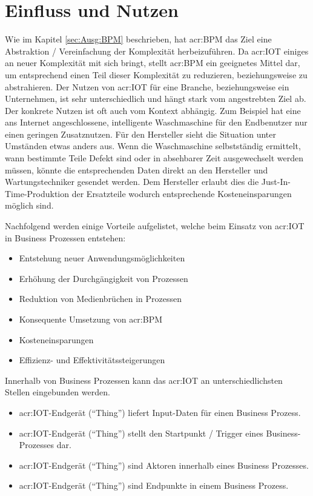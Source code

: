 \section{Einfluss und Nutzen}
Wie im Kapitel \ref{sec:Ausg:BPM}  beschrieben, hat \gls{acr:BPM} das Ziel eine Abstraktion / Vereinfachung der Komplexität herbeizuführen. Da \gls{acr:IOT} einiges an neuer Komplexität mit sich bringt, stellt \gls{acr:BPM} ein geeignetes Mittel dar, um entsprechend einen Teil dieser Komplexität zu reduzieren, beziehungsweise zu abstrahieren. Der Nutzen von \gls{acr:IOT} für eine Branche, beziehungsweise ein Unternehmen, ist sehr unterschiedlich und hängt stark vom angestrebten Ziel ab. Der konkrete Nutzen ist oft auch vom Kontext abhängig. Zum Beispiel hat eine ans Internet angeschlossene, intelligente Waschmaschine für den Endbenutzer nur einen geringen Zusatznutzen. Für den Hersteller sieht die Situation unter Umständen etwas anders aus. Wenn die Waschmaschine selbstständig ermittelt, wann bestimmte Teile Defekt sind oder in absehbarer Zeit ausgewechselt werden müssen, könnte die entsprechenden Daten direkt an den Hersteller und Wartungstechniker gesendet werden. Dem Hersteller erlaubt dies die Just-In-Time-Produktion der Ersatzteile wodurch entsprechende Kosteneinsparungen möglich sind.



Nachfolgend werden einige Vorteile aufgelistet, welche beim Einsatz von \gls{acr:IOT} in Business Prozessen entstehen:
\begin{itemize}
\item Entstehung neuer Anwendungsmöglichkeiten
\item Erhöhung der Durchgängigkeit von Prozessen
\item Reduktion von Medienbrüchen in Prozessen
\item Konsequente Umsetzung von \gls{acr:BPM}
\item Kosteneinsparungen
\item Effizienz- und Effektivitätssteigerungen
\end{itemize}

Innerhalb von Business Prozessen kann das \gls{acr:IOT} an unterschiedlichsten Stellen eingebunden werden.
\begin{itemize}
\item \gls{acr:IOT}-Endgerät ("`Thing"') liefert Input-Daten für einen Business Prozess.
\item \gls{acr:IOT}-Endgerät ("`Thing"') stellt den Startpunkt / Trigger eines Business-Prozesses dar.
\item \gls{acr:IOT}-Endgerät ("`Thing"') sind Aktoren innerhalb eines Business Prozesses.
\item \gls{acr:IOT}-Endgerät ("`Thing"') sind Endpunkte in einem Business Prozess.
\end{itemize}

